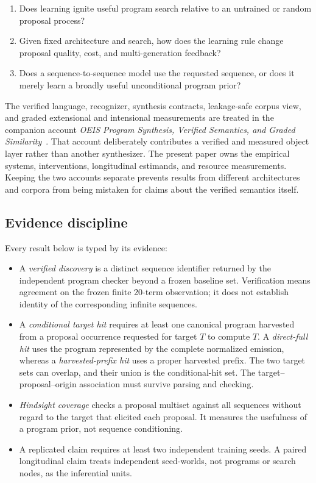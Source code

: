 \documentclass[11pt]{article}
\begin{document}
\begin{enumerate}
  \item Does learning ignite useful program search relative to an untrained or random
        proposal process?
  \item Given fixed architecture and search, how does the learning rule change proposal
        quality, cost, and multi-generation feedback?
  \item Does a sequence-to-sequence model use the requested sequence, or does it merely
        learn a broadly useful unconditional program prior?
\end{enumerate}

The verified language, recognizer, synthesis contracts, leakage-safe corpus view, and
graded extensional and intensional measurements are treated in the companion account
\emph{OEIS Program Synthesis, Verified Semantics, and Graded Similarity}~\cite{oeisaccount}.
That account deliberately contributes a verified and measured object layer rather than
another synthesizer.  The present paper owns the empirical systems, interventions,
longitudinal estimands, and resource measurements.  Keeping the two accounts separate
prevents results from different architectures and corpora from being mistaken for claims
about the verified semantics itself.

\subsection{Evidence discipline}

Every result below is typed by its evidence:

\begin{itemize}
  \item A \emph{verified discovery} is a distinct sequence identifier returned by the
        independent program checker beyond a frozen baseline set.  Verification means
        agreement on the frozen finite 20-term observation; it does not establish identity
        of the corresponding infinite sequences.
  \item A \emph{conditional target hit} requires at least one canonical program harvested
        from a proposal occurrence requested for target $T$ to compute $T$.  A
        \emph{direct-full hit} uses the program represented by the complete normalized
        emission, whereas a \emph{harvested-prefix hit} uses a proper harvested prefix.
        The two target sets can overlap, and their union is the conditional-hit set.  The
        target--proposal--origin association must survive parsing and checking.
  \item \emph{Hindsight coverage} checks a proposal multiset against all sequences without
        regard to the target that elicited each proposal.  It measures the usefulness of a
        program prior, not sequence conditioning.
  \item A replicated claim requires at least two independent training seeds.  A paired
        longitudinal claim treats independent seed-worlds, not programs or search nodes,
        as the inferential units.
\end{itemize}
\end{document}
